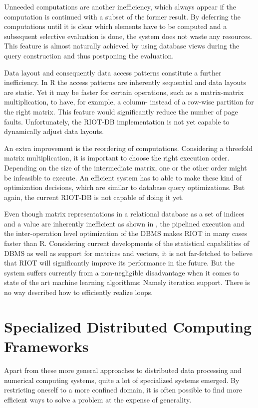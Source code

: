 Unneeded computations are another inefficiency, which always appear if the computation is continued with a subset of the former result.
By deferring the computations until it is clear which elements have to be computed and a subsequent selective evaluation is done, the system does not waste any resources.
This feature is almost naturally achieved by using database views during the query construction and thus postponing the evaluation.

Data layout and consequently data access patterns constitute a further inefficiency.
In R the access patterns are inherently sequential and data layouts are static.
Yet it may be faster for certain operations, such as a matrix-matrix multiplication, to have, for example, a column- instead of a row-wise partition for the right matrix.
This feature would significantly reduce the number of page faults.
Unfortunately, the RIOT-DB implementation is not yet capable to dynamically adjust data layouts.

An extra improvement is the reordering of computations.
Considering a threefold matrix multiplication, it is important to choose the right execution order.
Depending on the size of the intermediate matrix, one or the other order might be infeasible to execute.
An efficient system has to able to make these kind of optimization decisions, which are similar to database query optimizations.
But again, the current RIOT-DB is not capable of doing it yet.

Even though matrix representations in a relational database as a set of indices and a value are inherently inefficient as shown in \cite{stonebraker:2007a}, the pipelined execution and the inter-operation level optimization of the DBMS makes RIOT in many cases faster than R.
Considering current developments of the statistical capabilities of DBMS as well as support for matrices and vectors, it is not far-fetched to believe that RIOT will significantly improve its performance in the future.
But the system suffers currently from a non-negligible disadvantage when it comes to state of the art machine learning algorithms: Namely iteration support.
There is no way described how to efficiently realize loops.

\section{Specialized Distributed Computing Frameworks}

Apart from these more general approaches to distributed data processing and numerical computing systems, quite a lot of specialized systems emerged.
By restricting oneself to a more confined domain, it is often possible to find more efficient ways to solve a problem at the expense of generality.

